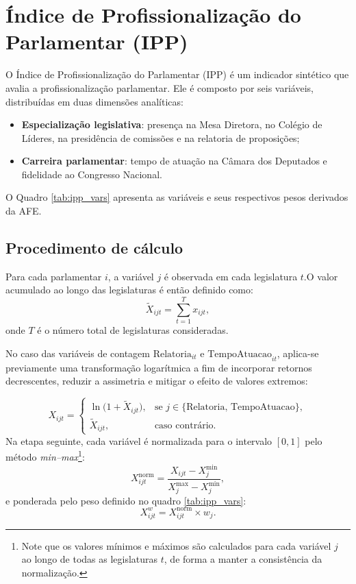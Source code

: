 \section{Índice de Profissionalização do Parlamentar (IPP)}


O Índice de Profissionalização do Parlamentar (IPP) é um indicador sintético que avalia a profissionalização parlamentar. Ele é composto por seis variáveis, distribuídas em duas dimensões analíticas:

\begin{itemize}
    \item \textbf{Especialização legislativa}: presença na Mesa Diretora, no Colégio de Líderes, na presidência de comissões e na relatoria de proposições;
    \item \textbf{Carreira parlamentar}: tempo de atuação na Câmara dos Deputados e fidelidade ao Congresso Nacional.
\end{itemize}

O Quadro \ref{tab:ipp_vars} apresenta as variáveis e seus respectivos pesos derivados da AFE.



\subsection{Procedimento de cálculo}

Para cada parlamentar \(i\), a variável \(j\) é observada em cada legislatura \(t\).O valor acumulado ao longo das legislaturas é então definido como:
\[
    \tilde{X}_{ijt} = \sum_{t=1}^{T} {x}_{ijt},
\]
onde \(T\) é o número total de legislaturas consideradas.

No caso das variáveis de contagem \(\mathrm{Relatoria}_{it}\) e \(\mathrm{TempoAtuacao}_{it}\), aplica-se previamente uma transformação logarítmica a fim de incorporar retornos decrescentes, reduzir a assimetria e mitigar o efeito de valores extremos:

\[
{X}_{ijt} =
\begin{cases}
\ln\!\big(1 + \tilde{X}_{ijt}\big), & \text{se } j \in \{\mathrm{Relatoria},\, \mathrm{TempoAtuacao}\},\\[2pt]
\tilde{X}_{ijt}, & \text{caso contrário.}
\end{cases}
\]
Na etapa seguinte, cada variável é normalizada para o intervalo \([0,1]\) pelo método \textit{min--max}\footnote{Note que os valores mínimos e máximos são calculados para cada variável \(j\) ao longo de todas as legislaturas \(t\), de forma a manter a consistência da normalização.}:
\[
X_{ijt}^{\mathrm{norm}} = \frac{X_{ijt} - X_{j}^{\min}}{X_{j}^{\max} - X_{j}^{\min}},
\] 
e ponderada pelo peso definido no quadro \ref{tab:ipp_vars}:
\[
X_{ijt}^{w} = X_{ijt}^{\mathrm{norm}} \times w_j.
\]

